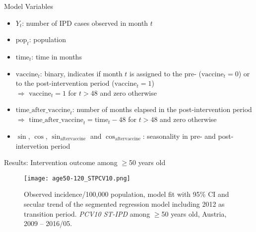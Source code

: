 \documentclass{beamer}\usepackage[]{graphicx}\usepackage[]{color}
\begin{document}
\begin{frame}[fragile]{Model Variables}
\begin{center}
\begin{itemize}
  \item $Y_t$: number of IPD cases observed in month $t$
  \item $\text{pop}_t$: population
  \item $\text{time}_t$: time in months
  \item $\text{vaccine}_t$: binary, indicates if month $t$ is assigned to the pre- ($\text{vaccine}_t=0$) or to the post-intervention period ($\text{vaccine}_t=1$) \\
  $\Rightarrow$ $\text{vaccine}_t=1$ for $t>48$ and zero otherwise
  \item $\text{time\_after\_vaccine}_t$: number of months elapsed in the post-intervention period \\
  $\Rightarrow$ $\text{time\_after\_vaccine}_t=\text{time}_t-48$ for $t>48$ and zero otherwise
  \item $\sin$, $\cos$, $\sin_{\text{aftervaccine}}$ and $\cos_{\text{aftervaccine}}$: seasonality in pre- and post-intervetion period
\end{itemize}
\end{center}
\end{frame}

\begin{frame}[fragile]{Results: Intervention outcome among $\ge$50 years old}
\begin{center}
\begin{figure}
  \centering
  \caption{Observed incidence/100,000 population, model fit with 95\% CI and secular trend of the segmented regression model including 2012 as transition period. \textit{PCV10 ST-IPD} among $\ge$50 years old, Austria, 2009 -- 2016/05.}
  \texttt{[image: age50-120\_STPCV10.png]}
\end{figure}

\end{center}
\end{frame}
\end{document}
